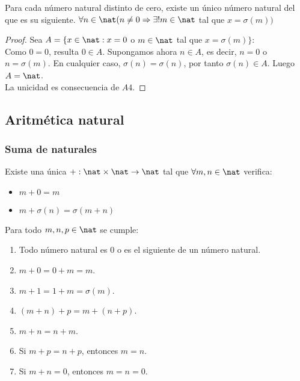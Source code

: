\begin{nth}
    Para cada número natural distinto de cero, existe un único número natural del que es su siguiente. $\forall n \in \nat (n \neq 0 \Rightarrow \exists! m \in \nat$ tal que $x = \sigma(m))$
\end{nth}
\begin{proof}
    Sea $A = \{x \in \nat : x = 0$ o $m \in \nat$ tal que $x = \sigma(m)\}$:\\
    Como $0 = 0$, resulta $0 \in A$. Supongamos ahora $n \in A$, es decir, $n = 0$ o $n = \sigma(m)$. En cualquier caso, $\sigma(n) = \sigma(n)$, por tanto $\sigma(n) \in A$. Luego $A = \nat$. \\
    La unicidad es consecuencia de $A4$.
\end{proof}

\subsection{Aritmética natural}
\subsubsection{Suma de naturales}
\begin{nth}
    Existe una única $+ : \nat \times \nat \rightarrow \nat$ tal que $\forall m,n \in \nat$ verifica:
    \begin{itemize}
        \item $m + 0 = m$
        \item $m + \sigma(n) = \sigma(m + n)$
    \end{itemize}
\end{nth}
\begin{properties}
    Para todo $m,n,p \in \nat$ se cumple:
    \begin{enumerate}
        \item Todo número natural es 0 o es el siguiente de un número natural.
        \item $m + 0 = 0 + m = m$.
        \item $m + 1 = 1 + m = \sigma(m)$.
        \item $(m + n) + p = m + (n + p)$.
        \item $m + n = n + m$.
        \item Si $m + p = n + p$, entonces $m = n$.
        \item Si $m + n = 0$, entonces $m = n = 0$.
    \end{enumerate}
\end{properties}

